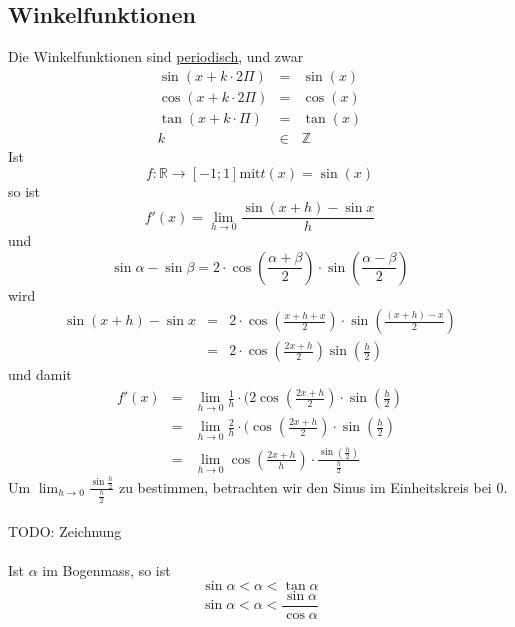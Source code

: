 \documentclass[a4paper,10pt]{report}
\newcommand{\Z}{{\mathbb Z}}
\newcommand{\R}{{\mathbb R}}
\begin{document}
\subsection{Winkelfunktionen}
Die Winkelfunktionen sind \underline{periodisch}, und zwar
\begin{eqnarray*}
	\sin(x+k\cdot2\Pi) &=& \sin(x)\\
	\cos(x+k\cdot2\Pi) &=& \cos(x)\\
	\tan(x + k\cdot \Pi) &=& \tan(x)\\
	k &\in& \Z
\end{eqnarray*}
Ist 
\begin{equation*}f: \R \to [-1;1] \text{mit} t(x) = \sin(x)\end{equation*}
so ist
\begin{equation*}f'(x) = \lim_{h \to 0}\frac{\sin(x+h) - \sin x}{h}\end{equation*}
und
\begin{equation*}\sin \alpha - \sin \beta = 2 \cdot \cos(\frac{\alpha + \beta}{2}) \cdot \sin(\frac{\alpha - \beta}{2})\end{equation*}
wird
\begin{eqnarray}\sin(x+h) - \sin x & = & 2 \cdot \cos(\frac{x+h+x}{2}) \cdot \sin(\frac{(x+h)-x}{2}) \nonumber \\
& = & 2 \cdot \cos(\frac{2x + h}{2}) \sin(\frac{h}{2})\end{eqnarray}
und damit
\begin{eqnarray}f'(x) & = & \lim_{h \to 0} \frac{1}{h} \cdot (2\cos(\frac{2x+h}{2}) \cdot \sin(\frac{h}{2}) \nonumber \\
& = & \lim_{h \to 0} \frac{2}{h} \cdot (\cos(\frac{2x+h}{2}) \cdot \sin(\frac{h}{2}) \nonumber \\
& = & \lim_{h \to 0} \cos(\frac{2x + h}{h}) \cdot \frac{\sin(\frac{h}{2})}{\frac{h}{2}}\end{eqnarray}
Um $\lim_{h \to 0} \frac{\sin \frac{h}{2}}{\frac{h}{2}}$ zu bestimmen, betrachten wir den Sinus im Einheitskreis bei $0$.
\\\\TODO: Zeichnung\\\\
Ist $\alpha$ im Bogenmass, so ist
\begin{equation*}\sin \alpha < \alpha < \tan \alpha\end{equation*}
\begin{equation*}\sin \alpha < \alpha < \frac{\sin \alpha}{\cos \alpha}\end{equation*}
\end{document}
